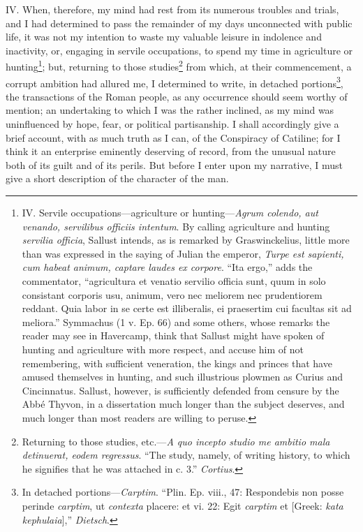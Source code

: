 IV. When, therefore, my mind had rest from its numerous troubles and
trials, and I had determined to pass the remainder of my days
unconnected with public life, it was not my intention to waste my
valuable leisure in indolence and inactivity, or, engaging in servile
occupations, to spend my time in agriculture or hunting\footnote{IV. Servile occupations—agriculture or hunting—\emph{Agrum
colendo, aut venando, servilibus officiis intentum}. By calling
agriculture and hunting \emph{servilia officia}, Sallust intends, as is
remarked by Graswinckelius, little more than was expressed in the
saying of Julian the emperor, \emph{Turpe est sapienti, cum habeat animum,
captare laudes ex corpore}. ``Ita ergo,'' adds the commentator,
``agricultura et venatio servilio officia sunt, quum in solo consistant
corporis usu, animum, vero nec meliorem nec prudentiorem reddant. Quia
labor in se certe est illiberalis, ei praesertim cui facultas sit ad
meliora.'' Symmachus (1 v. Ep. 66) and some others, whose remarks the
reader may see in Havercamp, think that Sallust might have spoken of
hunting and agriculture with more respect, and accuse him of not
remembering, with sufficient veneration, the kings and princes that
have amused themselves in hunting, and such illustrious plowmen as
Curius and Cincinnatus. Sallust, however, is sufficiently defended
from censure by the Abbé Thyvon, in a dissertation much longer than
the subject deserves, and much longer than most readers are willing to
peruse.}; but,
returning to those studies\footnote{Returning to those studies, etc.—\emph{A quo incepto studio me
ambitio mala detinuerat, eodem regressus}. ``The study, namely, of
writing history, to which he signifies that he was attached in c. 3.''
\emph{Cortius}.} from which, at their commencement, a
corrupt ambition had allured me, I determined to write, in detached
portions\footnote{In detached portions—\emph{Carptim}. ``Plin. Ep. viii., 47:
Respondebis non posse perinde \emph{carptim}, ut \emph{contexta} placere: et vi.
22: Egit \emph{carptim} et [Greek: \emph{kata kephulaia}],'' \emph{Dietsch}.}, the transactions of the Roman people, as any occurrence
should seem worthy of mention; an undertaking to which I was the
rather inclined, as my mind was uninfluenced by hope, fear, or
political partisanship. I shall accordingly give a brief account, with
as much truth as I can, of the Conspiracy of Catiline; for I think it
an enterprise eminently deserving of record, from the unusual nature
both of its guilt and of its perils. But before I enter upon my
narrative, I must give a short description of the character of the
man.

